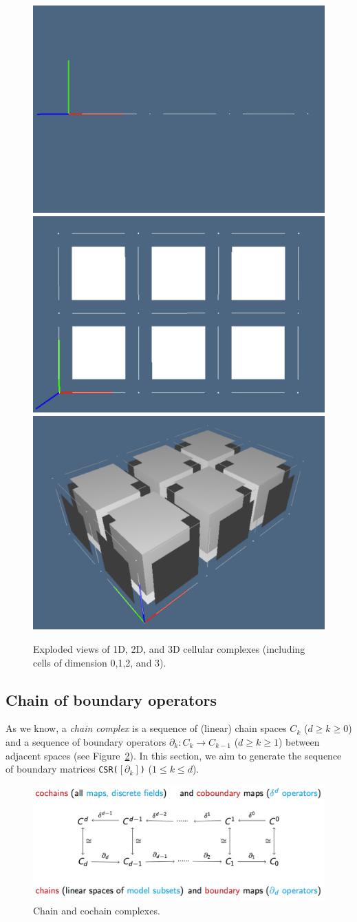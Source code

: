 \documentclass[11pt,oneside]{article}	%
\begin{document}
\begin{figure}[htbp] %
   \centering
   \includegraphics[width=0.313\linewidth]{images/complex3} 
   \includegraphics[width=0.33\linewidth]{images/complex32} 
   \includegraphics[width=0.305\linewidth]{images/complex321} 
   \caption{Exploded views of 1D, 2D, and 3D cellular complexes (including cells of dimension 0,1,2, and 3).}
   \label{fig:grid23D}
\end{figure}


\subsection{Chain of boundary operators}

As we know, a \emph{chain complex} is a sequence of (linear) chain spaces $C_k$ ($d\geq k\geq 0$) and a sequence
of boundary operators $\partial_k: C_k \to C_{k-1}$ ($d\geq k\geq 1$) between adjacent spaces (see Figure~\ref{fig:chainComplexMap}). In this section, we aim to generate the sequence of boundary matrices \texttt{CSR($[\partial_k]$)} ($1\leq k\leq d$).

\begin{figure}[htbp] %
   \centering
   \includegraphics[width=0.8\linewidth]{images/chainComplexMap} 
   \caption{Chain and cochain complexes.}
   \label{fig:chainComplexMap}
\end{figure}
\end{document}
